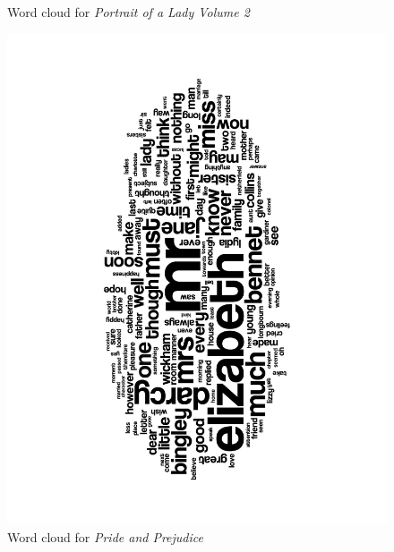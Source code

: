 \documentclass[a4paper,11pt,oneside]{book}
\begin{document}
\begin{enumerate}
\begin{figure}[htb]
\begin{center}
					\end{center}
					\caption{Word cloud for \emph{Portrait of a Lady Volume 2}}%
					\label{wcLadyTwo}%
				\end{figure}
				\begin{figure}[htb] 
					\begin{center}
					\includegraphics[angle=270,width=0.8\columnwidth]{resources/wordclouds/PrideAndPrejudice_WordCloud.pdf}%
					\end{center}
					\caption{Word cloud for \emph{Pride and Prejudice}}%
					\label{wcPride}%
				\end{figure}
				\begin{figure}[htb] 
					\begin{center}

\end{center}
\end{figure}
\end{enumerate}
\end{document}
